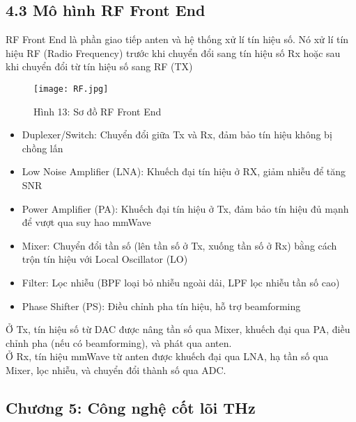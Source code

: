 \documentclass[a4paper,13pt]{article} %
\begin{document}
\subsection{4.3 Mô hình RF Front End}
RF Front End là phần giao tiếp anten và hệ thống xử lí tín hiệu số. Nó xử lí tín hiệu RF (Radio Frequency) trước khi chuyển đổi sang tín hiệu số Rx hoặc sau khi chuyển đổi từ tín hiệu số sang RF (TX)
\begin{figure}[htbp]
    \centering
    \texttt{[image: RF.jpg]}
    \caption*{Hình 13: Sơ đồ RF Front End \cite{key8} }
    \label{fig:model}
\end{figure}
\begin{itemize}
\item Duplexer/Switch: Chuyển đổi giữa Tx và Rx, đảm bảo tín hiệu không bị chồng lấn
\item Low Noise Amplifier (LNA): Khuếch đại tín hiệu ở RX, giảm nhiễu để tăng SNR
\item Power Amplifier (PA): Khuếch đại tín hiệu ở Tx, đảm bảo tín hiệu đủ mạnh để vượt qua suy hao mmWave
\item Mixer: Chuyển đổi tần số (lên tần số ở Tx, xuống tần số ở Rx) bằng cách trộn tín hiệu với Local Oscillator (LO)
\item Filter: Lọc nhiễu (BPF loại bỏ nhiễu ngoài dải, LPF lọc nhiễu tần số cao)
\item Phase Shifter (PS): Điều chỉnh pha tín hiệu, hỗ trợ beamforming
\end{itemize}
Ở Tx, tín hiệu số từ DAC được nâng tần số qua Mixer, khuếch đại qua PA, điều chỉnh pha (nếu có beamforming), và phát qua anten. \\
Ở Rx, tín hiệu mmWave từ anten được khuếch đại qua LNA, hạ tần số qua Mixer, lọc nhiễu, và chuyển đổi thành số qua ADC.
\begin{center}
   \section{Chương 5: Công nghệ cốt lõi THz} 
\end{center}
\end{document}
